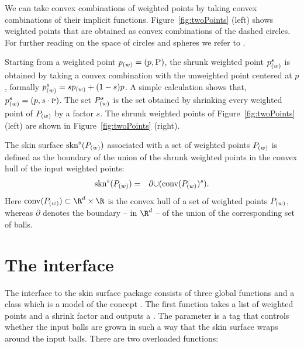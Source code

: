 We can take convex combinations of weighted points by taking convex
combinations of their implicit functions. Figure~\ref{fig:twoPoints}
(left) shows weighted points that are obtained as convex combinations
of the dashed circles. For further reading on the space of circles and
spheres we refer to \cite{p-gcc-70}.

Starting from a weighted point ${p}_{(w)}=({p},\textsc{P})$, the
shrunk weighted point ${p}_{(w)}^s$ is obtained by taking a convex
combination with the unweighted point centered at $p$, formally
${p}_{(w)}^s = s {p}_{(w)} + (1-s) p$. A simple calculation
shows that, ${p}_{(w)}^s = ({p},s\cdot \textsc{p})$.  The set
${P}_{(w)}^s$ is the set obtained by shrinking every weighted point
of ${P}_{(w)}$ by a factor $s$. The shrunk weighted points of
Figure~\ref{fig:twoPoints} (left) are shown in
Figure~\ref{fig:twoPoints} (right).

The skin surface $\mbox{skn}^{s}({P}_{(w)})$ associated with a set
of weighted points ${P}_{(w)}$ is defined as the boundary of the
union of the shrunk weighted points in the convex hull of the input
weighted points:
\begin{eqnarray}
  \label{eq:defskin}
  \mbox{skn}^{s}({P}_{(w)}) &=& \partial{\cup(\mbox{conv} ({P}_{(w)})^s)}.
\end{eqnarray}
%
Here $\mbox{conv}(\ssWpoint{P}) \subset \R^d\times\R$ is the convex
hull of a set of weighted points ${P}_{(w)}$, whereas $\partial$
denotes the boundary -- in $\R^d$ -- of the union of the corresponding
set of balls. 


\section{The interface}
The interface to the skin surface package consists of three global
functions and a class  which is a model of the
concept .  The first function takes a list of weighted
points and a shrink factor and outputs a . The
parameter  is a tag that controls whether the input balls are
grown in such a way that the skin surface wraps around the input
balls. There are two overloaded functions:


